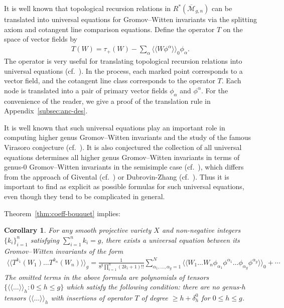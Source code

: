 \documentclass[12pt,reqno]{amsart}
\theoremstyle{plain}
\newtheorem{corollary}[theorem]{Corollary}
\theoremstyle{definition}
\theoremstyle{remark}
\begin{document}
It is well known that topological recursion relations in $R^*(\overline{\mathcal{M}}_{g,n})$ can be translated into universal equations for
Gromov--Witten invariants via the splitting axiom and cotangent line comparison equations.
Define the operator $T$ on the space of vector fields by
\begin{align}\label{eqn:T-operator}
T(W)=\tau_{+}(W)-\sum_{\alpha}\langle\langle W\phi^\alpha\rangle\rangle_0\phi_\alpha.    
\end{align}
The operator is very useful for translating topological recursion relations  into universal equations (cf.\ \cite{liu2006gromov}).
In the process, each marked point corresponds to a vector field, and the cotangent line class corresponds to the operator $T$.
Each node is translated into a pair
of primary vector fields $\phi_\alpha$ and $\phi^\alpha$.
For  the convenience of the reader, we give a proof of the translation rule in Appendix~\ref{subsec:anc-des}.

It is well known that such universal equations play an important role in computing higher genus Gromov--Witten invariants and the study of the famous Virasoro conjecture (cf.\ \cite{liu2002quantum}).
It is also conjectured the collection of all universal equations determines all higher genus Gromov--Witten invariants  in terms of genus-0 Gromov--Witten invariants in the semisimple case (cf.\ \cite{liu2006gromov}), which differs from the approach of Givental (cf.\ \cite{givental2001semisimple}) or Dubrovin-Zhang (cf.\ \cite{dubrovin1998bihamiltonian}).   
Thus it is important to find as explicit as possible formulas for such universal  equations, even though they tend to be complicated in general.



Theorem~\ref{thm:coeff-bouquet} implies:
\begin{corollary}\label{cor:bouquet-correlation-fun}
For any smooth projective variety $X$ and  non-negative integers $\{k_i\}_{i=1}^{n}$ satisfying $\sum_{i=1}^{n}k_i=g$, there exists a universal equation between its Gromov--Witten invariants of the form
\begin{align*}
\langle\langle T^{k_1}(W_1)\ldots T^{k_n}(W_n)\rangle\rangle_g =\frac{1}{8^g \prod_{i=1}^{n}(2k_i+1)!!}\sum_{\alpha_1,\dots ,\alpha_g=1}^{N}\langle\langle W_1\ldots W_n\phi_{\alpha_1}\phi^{\alpha_1}\ldots \phi_{\alpha_g}\phi^{\alpha_g}\rangle\rangle_0+\cdots
\end{align*}
 The omitted terms in the above formula are polynomials of tensors $\{\langle\langle\ldots\rangle\rangle_h: 0\leq h\leq g\}$ which satisfy the following condition: there are no
 genus-$h$ tensors $\langle\langle\ldots\rangle\rangle_h$  with insertions  of operator $T$  of degree $\geq h+\delta_{h}^0$ for
$0\leq h\leq g$.
\end{corollary}
\end{document}
